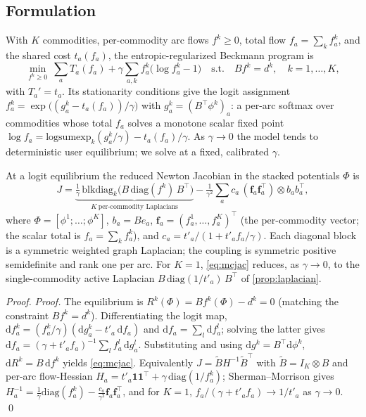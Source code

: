 \documentclass[ijoc]{informs3}
\begin{document}
\subsection{Formulation}
With $K$ commodities, per-commodity arc flows $f^k\ge0$, total flow $f_a=\sum_k f^k_a$, and the shared cost
$t_a(f_a)$, the entropic-regularized Beckmann program is
\begin{equation}\label{eq:mcbeck}
  \min_{f^k\ge0}\ \sum_a T_a(f_a)+\gamma\sum_{a,k}f^k_a\bigl(\log f^k_a-1\bigr)
  \quad\text{s.t.}\quad B f^k=d^k,\quad k=1,\dots,K,
\end{equation}
with $T_a'=t_a$. Its stationarity conditions give the logit assignment
$f^k_a=\exp\!\bigl((g^k_a-t_a(f_a))/\gamma\bigr)$ with $g^k_a=(B^\top\phi^k)_a$: a per-arc softmax over commodities
whose total $f_a$ solves a monotone scalar fixed point $\log f_a=\mathrm{logsumexp}_k(g^k_a/\gamma)-t_a(f_a)/\gamma$.
As $\gamma\to0$ the model tends to deterministic user equilibrium; we solve at a fixed, calibrated $\gamma$.

\begin{proposition}\label{prop:mc}
At a logit equilibrium the reduced Newton Jacobian in the stacked potentials $\Phi$ is
\begin{equation}\label{eq:mcjac}
  J=\underbrace{\tfrac1\gamma\,\mathrm{blkdiag}_k\!\bigl(B\,\mathrm{diag}(f^k)\,B^\top\bigr)}_{K\ \text{per-commodity Laplacians}}
   -\tfrac1{\gamma^2}\sum_a c_a\,(\mathbf f_a \mathbf f_a^\top)\otimes b_a b_a^\top,
\end{equation}
where $\Phi=[\phi^1;\dots;\phi^K]$, $b_a=Be_a$, $\mathbf f_a=(f^1_a,\dots,f^K_a)^\top$ (the per-commodity vector; the scalar total is $f_a=\sum_k f^k_a$), and $c_a=t'_a/(1+t'_a f_a/\gamma)$. Each diagonal block is a symmetric weighted graph Laplacian;
the coupling is symmetric positive semidefinite and rank one per arc. For $K=1$, \cref{eq:mcjac} reduces, as
$\gamma\to0$, to the single-commodity active Laplacian $B\,\mathrm{diag}(1/t'_a)\,B^\top$ of \cref{prop:laplacian}.
\end{proposition}
\begin{proof}{\it Proof.}
The equilibrium is $R^k(\Phi)=Bf^k(\Phi)-d^k=0$ (matching the constraint $Bf^k=d^k$). Differentiating the logit map,
$\mathrm{d}f^k_a=(f^k_a/\gamma)(\mathrm{d}g^k_a-t'_a\,\mathrm{d}f_a)$ and $\mathrm{d}f_a=\sum_l\mathrm{d}f^l_a$; solving
the latter gives $\mathrm{d}f_a=(\gamma+t'_af_a)^{-1}\sum_l f^l_a\,\mathrm{d}g^l_a$. Substituting and using
$\mathrm{d}g^k=B^\top\mathrm{d}\phi^k$, $\mathrm{d}R^k=B\,\mathrm{d}f^k$ yields \cref{eq:mcjac}. Equivalently
$J=\tilde B H^{-1}\tilde B^\top$ with $\tilde B=I_K\otimes B$ and per-arc flow-Hessian
$H_a=t'_a\mathbf1\mathbf1^\top+\gamma\,\mathrm{diag}(1/f^k_a)$; Sherman--Morrison gives
$H_a^{-1}=\tfrac1\gamma\mathrm{diag}(f^k_a)-\tfrac{c_a}{\gamma^2}\mathbf f_a\mathbf f_a^\top$, and for $K=1$,
$f_a/(\gamma+t'_af_a)\to1/t'_a$ as $\gamma\to0$. \qed
\end{proof}
\end{document}
